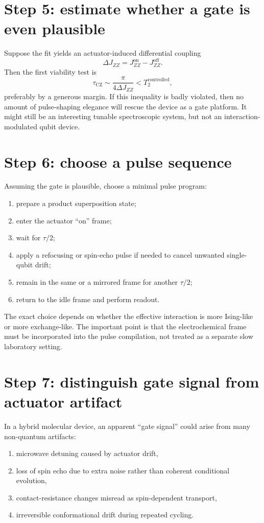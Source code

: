 \documentclass[11pt]{report}
\theoremstyle{definition}
\begin{document}
\section{Step 5: estimate whether a gate is even plausible}
Suppose the fit yields an actuator-induced differential coupling
\[
\Delta J_{ZZ} = J_{ZZ}^{\mathrm{on}} - J_{ZZ}^{\mathrm{off}}.
\]
Then the first viability test is
\[
\tau_{\mathrm{CZ}} \sim \frac{\pi}{4\Delta J_{ZZ}} < T_2^{\mathrm{controlled}},
\]
preferably by a generous margin. If this inequality is badly violated, then no amount of pulse-shaping elegance will rescue the device as a gate platform. It might still be an interesting tunable spectroscopic system, but not an interaction-modulated qubit device.

\section{Step 6: choose a pulse sequence}
Assuming the gate is plausible, choose a minimal pulse program:

\begin{enumerate}[leftmargin=2em]
\item prepare a product superposition state;
\item enter the actuator ``on'' frame;
\item wait for $\tau/2$;
\item apply a refocusing or spin-echo pulse if needed to cancel unwanted single-qubit drift;
\item remain in the same or a mirrored frame for another $\tau/2$;
\item return to the idle frame and perform readout.
\end{enumerate}

The exact choice depends on whether the effective interaction is more Ising-like or more exchange-like. The important point is that the electrochemical frame must be incorporated into the pulse compilation, not treated as a separate slow laboratory setting.

\section{Step 7: distinguish gate signal from actuator artifact}
In a hybrid molecular device, an apparent ``gate signal'' could arise from many non-quantum artifacts:

\begin{enumerate}[leftmargin=2em]
\item microwave detuning caused by actuator drift,
\item loss of spin echo due to extra noise rather than coherent conditional evolution,
\item contact-resistance changes misread as spin-dependent transport,
\item irreversible conformational drift during repeated cycling.
\end{enumerate}
\end{document}
